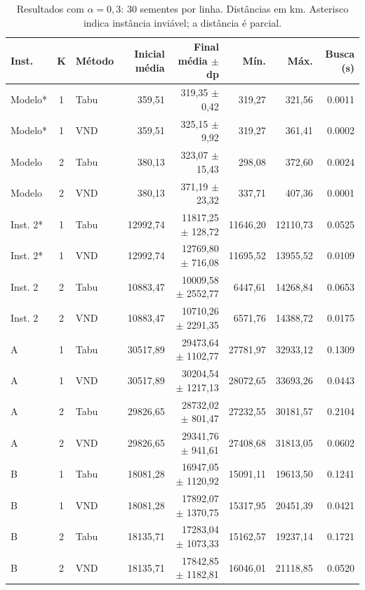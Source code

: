 \begin{table}[ht]
\centering\scriptsize
\caption{Resultados com $\alpha=0{,}3$: 30 sementes por linha. Distâncias em km. Asterisco indica instância inviável; a distância é parcial.}
\begin{tabular}{lclrrrrr}
\hline Inst. & K & Método & Inicial média & Final média $\pm$ dp & Mín. & Máx. & Busca (s) \\ \hline
Modelo* & 1 & Tabu & 359,51 & 319,35 $\pm$ 0,42 & 319,27 & 321,56 & 0.0011 \\
Modelo* & 1 & VND & 359,51 & 325,15 $\pm$ 9,92 & 319,27 & 361,41 & 0.0002 \\
Modelo & 2 & Tabu & 380,13 & 323,07 $\pm$ 15,43 & 298,08 & 372,60 & 0.0024 \\
Modelo & 2 & VND & 380,13 & 371,19 $\pm$ 23,32 & 337,71 & 407,36 & 0.0001 \\
Inst. 2* & 1 & Tabu & 12992,74 & 11817,25 $\pm$ 128,72 & 11646,20 & 12110,73 & 0.0525 \\
Inst. 2* & 1 & VND & 12992,74 & 12769,80 $\pm$ 716,08 & 11695,52 & 13955,52 & 0.0109 \\
Inst. 2 & 2 & Tabu & 10883,47 & 10009,58 $\pm$ 2552,77 & 6447,61 & 14268,84 & 0.0653 \\
Inst. 2 & 2 & VND & 10883,47 & 10710,26 $\pm$ 2291,35 & 6571,76 & 14388,72 & 0.0175 \\
A & 1 & Tabu & 30517,89 & 29473,64 $\pm$ 1102,77 & 27781,97 & 32933,12 & 0.1309 \\
A & 1 & VND & 30517,89 & 30204,54 $\pm$ 1217,13 & 28072,65 & 33693,26 & 0.0443 \\
A & 2 & Tabu & 29826,65 & 28732,02 $\pm$ 801,47 & 27232,55 & 30181,57 & 0.2104 \\
A & 2 & VND & 29826,65 & 29341,76 $\pm$ 941,61 & 27408,68 & 31813,05 & 0.0602 \\
B & 1 & Tabu & 18081,28 & 16947,05 $\pm$ 1120,92 & 15091,11 & 19613,50 & 0.1241 \\
B & 1 & VND & 18081,28 & 17892,07 $\pm$ 1370,75 & 15317,95 & 20451,39 & 0.0421 \\
B & 2 & Tabu & 18135,71 & 17283,04 $\pm$ 1073,33 & 15162,57 & 19237,14 & 0.1721 \\
B & 2 & VND & 18135,71 & 17842,85 $\pm$ 1182,81 & 16046,01 & 21118,85 & 0.0520 \\
\hline\end{tabular}
\label{tab:principal}
\end{table}
